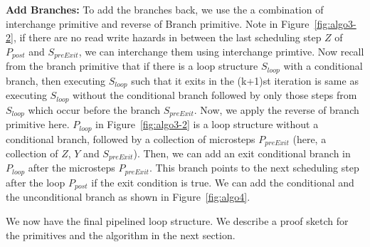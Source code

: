 {\bf Add Branches:}  To add the branches back, we use the a combination of interchange primitive and reverse of Branch primitive. Note in Figure~\ref{fig:algo3-2}, if there are no read write hazards in between the last scheduling step $Z$ of $P_{post}$ and $S_{preExit}$, we can interchange them using interchange primtive. Now recall from the branch primitive that if there is a loop structure $S_{loop}$ with a conditional branch, then executing $S_{loop}$ such that it exits in the (k+1)st iteration is same as executing $S_{loop}$ without the conditional branch followed by only those steps from $S_{loop}$ which occur before the branch $S_{preExit}$. Now, we apply the reverse of branch primitive here. $P_{loop}$ in Figure~\ref{fig:algo3-2} is a loop structure without a conditional branch, followed by a collection of microsteps $P_{preExit}$ (here, a collection of $Z$, $Y$ and $S_{preExit}$). Then, we can add an exit conditional branch in $P_{loop}$ after the microsteps $P_{preExit}$. This branch points to the next scheduling step after the loop $P_{post}$ if the exit condition is true. We can add the conditional and the unconditional branch as shown in  Figure~\ref{fig:algo4}.  

We now have the final pipelined loop structure. We describe a proof sketch for the primitives and the algorithm in the next section.
